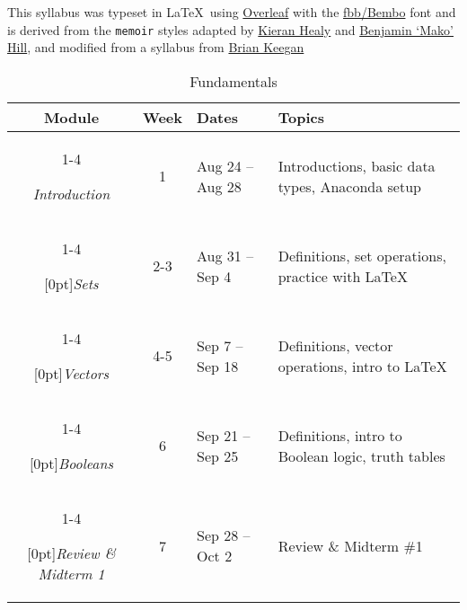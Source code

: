 \documentclass[10pt]{memoir}
\begin{document}
This syllabus was typeset in \LaTeX~using \href{http://www.sharelatex.com}{Overleaf} with the \href{http://www.tug.dk/FontCatalogue/fbb/}{fbb/Bembo} font and is derived from the \texttt{memoir} styles adapted by \href{https://github.com/kjhealy/latex-custom-kjh}{Kieran Healy} and \href{http://projects.mako.cc/source/?p=latex_mako;a=summary}{Benjamin `Mako' Hill}, and modified from a syllabus from \href{https://www.brianckeegan.com/}{Brian Keegan} 

\clearpage

\vspace{2em}

\begin{table}[h]
\centering
\begin{tabular}{ccll}
    \toprule[.15em]
    \textbf{Module} & \textbf{Week} & \textbf{Dates} & \textbf{Topics} \\
    \cmidrule[.1em](lr){1-4}
    
    \textit{Introduction} & 1 & Aug 24 -- Aug 28 & Introductions, basic data types, Anaconda setup \\
    \cmidrule[.1em](lr){1-4} 
 
     \multirow{1}{*}[0pt]{\textit{Sets}} %
        & 2-3 & Aug 31 -- Sep 4 & Definitions, set operations, practice with \LaTeX \\ 
        \cmidrule[.1em](lr){1-4}
        
    \multirow{1}{*}[0pt]{\textit{Vectors}} %
        & 4-5 & Sep 7 -- Sep 18 & Definitions, vector operations, intro to  \LaTeX  \\ \cmidrule[.1em](lr){1-4}

    \multirow{1}{*}[0pt]{\textit{Booleans}} %
        & 6 & Sep 21 -- Sep 25 & Definitions, intro to Boolean logic, truth tables \\   \cmidrule[.1em](lr){1-4}    

   \multirow{1}{*}[0pt]{\textit{Review \& Midterm 1}} %
        & 7 & Sep 28 -- Oct 2 & Review \& Midterm \#1 \\         
      
    \bottomrule[.15em]
\end{tabular}\\
\caption{Fundamentals}
\end{table}

\vspace{2em}
\end{document}
